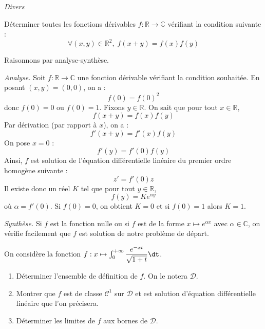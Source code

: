 \documentclass[a4paper,10pt]{report}
\begin{document}
\medskip

\begin{center}
\textit{{ {\large Divers}}}
\end{center}

\medskip





























\begin{Exercice}{} Déterminer toutes les fonctions dérivables $f : \mathbb{R} \rightarrow \mathbb{C}$ vérifiant la condition suivante :
$$ \forall (x,y) \in \mathbb{R}^2, \; f(x+y)=f(x)f(y)$$
\end{Exercice}

\corr Raisonnons par analyse-synthèse.

\medskip

\noindent \textit{Analyse.} Soit $f : \mathbb{R} \rightarrow \mathbb{C}$ une fonction dérivable vérifiant la condition souhaitée. En posant $(x,y)=(0,0)$, on a :
$$ f(0)=f(0)^2$$
donc $f(0)=0$ ou $f(0)=1$. Fixons $y \in \mathbb{R}$. On sait que pour tout $x \in \mathbb{R}$,
$$ f(x+y) = f(x)f(y)$$
Par dérivation (par rapport à $x$), on a :
$$ f'(x+y) = f'(x)f(y)$$
On pose $x=0$ :
$$ f'(y)=f'(0) f(y)$$
Ainsi, $f$ est solution de l'équation différentielle linéaire du premier ordre homogène suivante :
$$ z'= f'(0) z$$
Il existe donc un réel $K$ tel que pour tout $y \in \mathbb{R}$,
$$ f(y) = K e^{\alpha y}$$
où $\alpha = f'(0)$. Si $f(0)=0$, on obtient $K=0$ et si $f(0)=1$ alors $K=1$.

\medskip

\noindent \textit{Synthèse.} Si $f$ est la fonction nulle ou si $f$ est de la forme $x \mapsto e^{\alpha x}$ avec $\alpha \in \mathbb{C}$, on vérifie facilement que $f$ est solution de notre problème de départ.



\begin{Exercice}{} On considère la fonction $f : x \mapsto \int_0^{+ \infty} \dfrac{e^{-xt}}{\sqrt{1+t}} \dt$.
\begin{enumerate}
\item Déterminer l'ensemble de définition de $f$. On le notera $\mathcal{D}$.
\item Montrer que $f$ est de classe $\mathcal{C}^1$ sur $\mathcal{D}$ et est solution d'équation différentielle linéaire que l'on précisera.
\item Déterminer les limites de $f$ aux bornes de $\mathcal{D}$.
\end{enumerate}
\end{Exercice}
\end{document}
